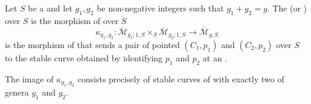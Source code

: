 \begin{definition} \label{definition:clutching_morphism_of_moduli_for_two_curves_over_a_scheme}
    Let $S$ be a  and let $g_1, g_2$ be non-negative integers such that $g_1 + g_2 = g$.
    The  (or ) over $S$ is the morphism of  over $S$
    $$\kappa_{g_1, g_2}\colon \overline{\mathcal{M}}_{g_1; 1, S} \times_S \overline{\mathcal{M}}_{g_2; 1, S} \to \overline{\mathcal{M}}_{g, S}$$
    is the morphism of  that sends a pair of pointed  $(C_1, p_1)$ and $(C_2, p_2)$ over $S$ to the stable curve obtained by identifying $p_1$ and $p_2$ at an .

    The image of $\kappa_{g_1, g_2}$ consists precisely of stable curves of  with exactly two  of genera $g_1$ and $g_2$.
\end{definition}